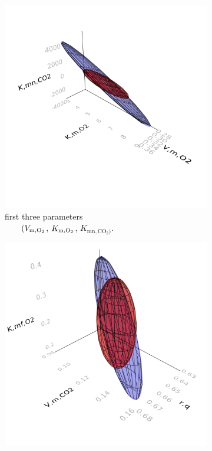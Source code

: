 \begin{figure}[H]
	\begin{subfigure}[b]{0.45\textwidth}
		\includegraphics[width=1.0\textwidth]{figure/paper 2/ellipsoid1_3.png}
		\caption{first three parameters \\ $\qquad(V_{\text{m},\text{O}_2}$, $K_{\text{m},\text{O}_2}$, $K_{\text{mn},\text{CO}_2)}$.}
		\label{figlocalf}
	\end{subfigure}
	\begin{subfigure}[b]{0.45\textwidth}
		\includegraphics[width=1.0\textwidth]{figure/paper 2/ellipsoid4_6.png}

\end{subfigure}
\end{figure}
